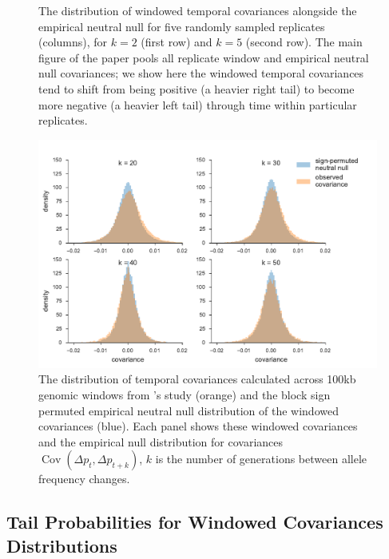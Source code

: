 \documentclass[11pt]{article}
\DeclareMathOperator{\cov}{Cov}
\begin{document}
{{\begin{figure}[!ht]
  \caption{The distribution of windowed temporal covariances alongside the
    empirical neutral null for five randomly sampled replicates (columns), for
    $k=2$ (first row) and $k=5$ (second row). The main figure of the paper
    pools all replicate window and empirical neutral null covariances; we show
    here the windowed temporal covariances tend to shift from being positive (a
    heavier right tail) to become more negative (a heavier left tail) through
    time within particular replicates.}
  
  \label{suppfig:barghi-offset-replicate-panels}
\end{figure}



\begin{figure}[!ht]
  \centering
  \includegraphics[]{figures/barghi-offset-panels.pdf}

  \caption{The distribution of temporal covariances calculated across 100kb
    genomic windows from \textcite{Barghi2019-qy}'s study (orange) and the
    block sign permuted empirical neutral null distribution of the windowed
    covariances (blue). Each panel shows these windowed covariances and the
    empirical null distribution for covariances $\cov(\Delta p_t, \Delta p_{t+k})$,
  $k$ is the number of generations between allele frequency changes.}
  \label{suppfig:barghi-empnull-tilecovs}
\end{figure}


\clearpage
\subsection{\textcite{Barghi2019-qy} Tail Probabilities for Windowed Covariances Distributions}

}}
\end{document}
